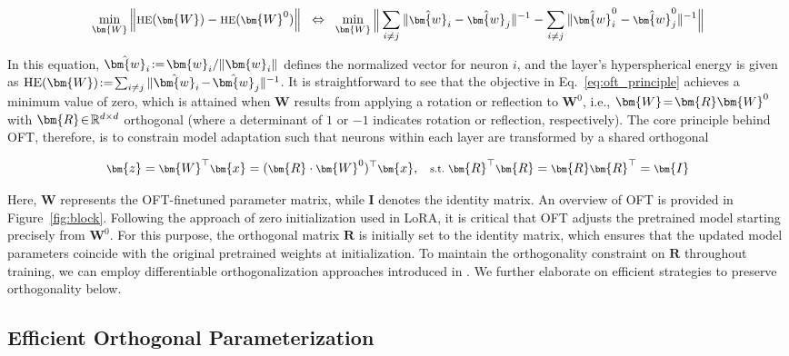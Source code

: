 \begin{equation}\label{eq:oft_principle}
\footnotesize
\min_{\bm{W}} \left\| \text{HE}(\bm{W})-\text{HE}(\bm{W}^0)\right\|~~\Leftrightarrow~~\min_{\bm{W}} \bigg{\|} \sum_{i\neq j} \|\hat{\bm{w}}_i-\hat{\bm{w}}_j\|^{-1}-\sum_{i\neq j} \|\hat{\bm{w}}^0_i-\hat{\bm{w}}^0_j\|^{-1}\bigg{\|}
\end{equation}

In this equation, $\thickmuskip=2mu \medmuskip=2mu \hat{\bm{w}}_i:=\bm{w}_i/\|\bm{w}_i\|$ defines the normalized vector for neuron $i$, and the layer’s hyperspherical energy is given as $\thickmuskip=2mu \medmuskip=2mu \text{HE}(\bm{W}):= \sum_{i\neq j} \|\hat{\bm{w}}_i-\hat{\bm{w}}_j\|^{-1}$. It is straightforward to see that the objective in Eq.~\eqref{eq:oft_principle} achieves a minimum value of zero, which is attained when $\bm{W}$ results from applying a rotation or reflection to $\bm{W}^0$, i.e., $\thickmuskip=2mu \medmuskip=2mu \bm{W}=\bm{R}\bm{W}^0$ with $\thickmuskip=2mu \medmuskip=2mu \bm{R}\in\mathbb{R}^{d\times d}$ orthogonal (where a determinant of $1$ or $-1$ indicates rotation or reflection, respectively). The core principle behind OFT, therefore, is to constrain model adaptation such that neurons within each layer are transformed by a shared orthogonal

\begin{equation}\label{eq:oft_general}
    \footnotesize
    \bm{z}=\bm{W}^\top\bm{x}=(\bm{R}\cdot\bm{W}^0)^\top\bm{x},~~~\text{s.t.}~\bm{R}^\top\bm{R}=\bm{R}\bm{R}^\top=\bm{I}
\end{equation}

Here, $\bm{W}$ represents the OFT-finetuned parameter matrix, while $\bm{I}$ denotes the identity matrix. An overview of OFT is provided in Figure~\ref{fig:block}. Following the approach of zero initialization used in LoRA, it is critical that OFT adjusts the pretrained model starting precisely from $\bm{W}^0$. For this purpose, the orthogonal matrix $\bm{R}$ is initially set to the identity matrix, which ensures that the updated model parameters coincide with the original pretrained weights at initialization. To maintain the orthogonality constraint on $\bm{R}$ throughout training, we can employ differentiable orthogonalization approaches introduced in \cite{liu2021orthogonal,lezcano2019cheap}. We further elaborate on efficient strategies to preserve orthogonality below.

\subsection{Efficient Orthogonal Parameterization}\label{sect:eff_ortho}

